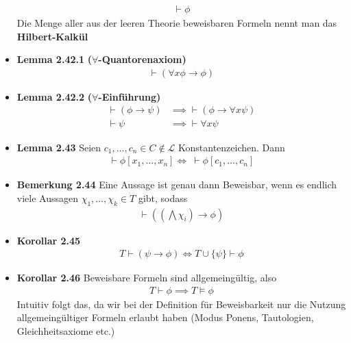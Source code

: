 \documentclass{scrartcl}
\renewcommand{\models}[0]{\vDash}
\begin{document}
\begin{itemize}
    \begin{align*}
        \vdash \phi
    \end{align*}
    Die Menge aller aus der leeren Theorie beweisbaren Formeln nennt man das \textbf{Hilbert-Kalkül}
    \item \textbf{Lemma 2.42.1} \textbf{($\forall$-Quantorenaxiom)}
    \begin{align*}
        \vdash (\forall x\phi \to \phi)
    \end{align*}
    \item \textbf{Lemma 2.42.2} \textbf{($\forall$-Einführung)}
    \begin{align*}
        \vdash (\phi \to \psi) &\implies \vdash (\phi \to \forall x \psi)\\
        \vdash \psi &\implies \vdash \forall x \psi
    \end{align*}
    \item \textbf{Lemma 2.43} Seien $c_1, \hdots, c_n \in C \notin \mathcal{L}$ Konstantenzeichen. Dann
    \begin{align*}
        \vdash \phi[x_1, \hdots, x_n] \Longleftrightarrow\ \vdash \phi[c_1, \hdots, c_n]
    \end{align*}
    \item \textbf{Bemerkung 2.44} Eine Aussage ist genau dann Beweisbar, wenn es endlich viele Aussagen $\chi_1, \hdots, \chi_k \in T$ gibt, sodass
    \begin{align*}
        \vdash ((\bigwedge \chi_i) \to \phi)
    \end{align*}
    \item \textbf{Korollar 2.45}
    \begin{align*}
        T \vdash (\psi \to \phi) \Longleftrightarrow T \cup \{\psi\} \vdash \phi
    \end{align*}
    \item \textbf{Korollar 2.46}
    Beweisbare Formeln sind allgemeingültig, also
    \begin{align*}
        T \vdash \phi \implies T \models \phi 
    \end{align*}
    Intuitiv folgt das, da wir bei der Definition für Beweisbarkeit nur die Nutzung allgemeingültiger Formeln erlaubt haben (Modus Ponens, Tautologien, Gleichheitsaxiome etc.)
\end{itemize}
\end{document}
